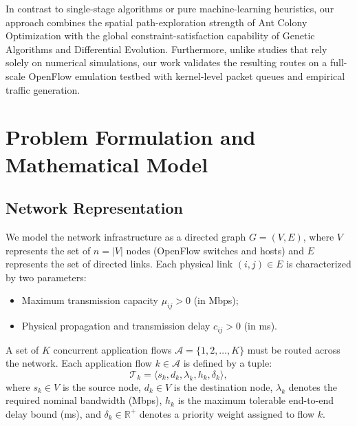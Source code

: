 \documentclass[journal]{IEEEtran}
\begin{document}
In contrast to single-stage algorithms or pure machine-learning heuristics, our approach combines the spatial path-exploration strength of Ant Colony Optimization with the global constraint-satisfaction capability of Genetic Algorithms and Differential Evolution. Furthermore, unlike studies that rely solely on numerical simulations, our work validates the resulting routes on a full-scale OpenFlow emulation testbed with kernel-level packet queues and empirical traffic generation.

\section{Problem Formulation and Mathematical Model}
\label{sec:model}

\subsection{Network Representation}
We model the network infrastructure as a directed graph $G = (V, E)$, where $V$ represents the set of $n = |V|$ nodes (OpenFlow switches and hosts) and $E$ represents the set of directed links. Each physical link $(i, j) \in E$ is characterized by two parameters:
\begin{itemize}
    \item Maximum transmission capacity $\mu_{ij} > 0$ (in Mbps);
    \item Physical propagation and transmission delay $c_{ij} > 0$ (in ms).
\end{itemize}

A set of $K$ concurrent application flows $\mathcal{A} = \{1, 2, \dots, K\}$ must be routed across the network. Each application flow $k \in \mathcal{A}$ is defined by a tuple:
\begin{equation}
\mathcal{T}_k = \langle s_k, d_k, \lambda_k, h_k, \delta_k \rangle,
\end{equation}
where $s_k \in V$ is the source node, $d_k \in V$ is the destination node, $\lambda_k$ denotes the required nominal bandwidth (Mbps), $h_k$ is the maximum tolerable end-to-end delay bound (ms), and $\delta_k \in \mathbb{R}^+$ denotes a priority weight assigned to flow $k$.
\end{document}
